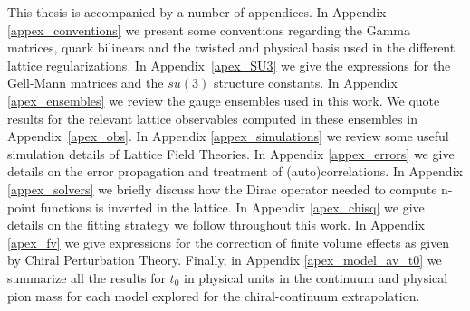 This thesis is accompanied by a number of appendices. In Appendix \ref{appex_conventions} we present some conventions regarding the Gamma matrices, quark bilinears and the twisted and physical basis used in the different lattice regularizations. In Appendix~\ref{apex_SU3} we give the expressions for the Gell-Mann matrices and the $su(3)$ structure constants. In Appendix \ref{apex_ensembles} we review the gauge ensembles used in this work. We quote results for the relevant lattice observables computed in these ensembles in Appendix~\ref{apex_obs}. In Appendix \ref{appex_simulations} we review some useful simulation details of Lattice Field Theories. In Appendix \ref{appex_errors} we give details on the error propagation and treatment of (auto)correlations. In Appendix \ref{appex_solvers} we briefly discuss how the Dirac operator needed to compute n-point functions is inverted in the lattice. In Appendix \ref{apex_chisq} we give details on the fitting strategy we follow throughout this work. In Appendix \ref{apex_fv} we give expressions for the correction of finite volume effects as given by Chiral Perturbation Theory. Finally, in Appendix \ref{apex_model_av_t0} we summarize all the results for $t_0$ in physical units in the continuum and physical pion mass for each model explored for the chiral-continuum extrapolation.

